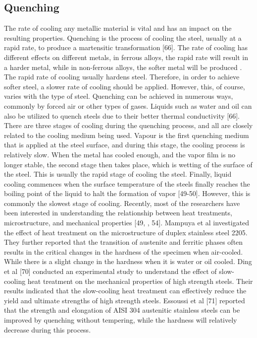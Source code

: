 \documentclass[12pt]{report}
\begin{document}
\subsection{Quenching}  
The rate of cooling any metallic material is vital and has an impact on the resulting properties. Quenching is the process of cooling the steel, usually at a rapid rate, to produce a martensitic transformation [66]. The rate of cooling has different effects on different metals, in ferrous alloys, the rapid rate will result in a harder metal, while in non-ferrous alloys, the softer metal will be produced \cite{mampuya2021effect}. The rapid rate of cooling usually hardens steel. Therefore, in order to achieve softer steel, a slower rate of cooling should be applied. However, this, of course, varies with the type of steel. 
Quenching can be achieved in numerous ways, commonly by forced air or other types of gases. Liquids such as water and oil can also be utilized to quench steels due to their better thermal conductivity [66]. There are three stages of cooling during the quenching process, and all are closely related to the cooling medium being used. Vapour is the first quenching medium that is applied at the steel surface, and during this stage, the cooling process is relatively slow. When the metal has cooled enough, and the vapor film is no longer stable, the second stage then takes place, which is wetting of the surface of the steel. This is usually the rapid stage of cooling the steel. Finally, liquid cooling commences when the surface temperature of the steels finally reaches the boiling point of the liquid to halt the formation of vapor [49-50]. However, this is commonly the slowest stage of cooling.
Recently, most of the researchers have been interested in understanding the relationship between heat treatments, microstructure, and mechanical properties [49, \cite{whitman1924effect}, 54]. Mampuya et al \cite{mampuya2021effect} investigated the effect of heat treatment on the microstructure of duplex stainless steel 2205. They further reported that the transition of austenite and ferritic phases often results in the critical changes in the hardness of the specimen when air-cooled. While there is a slight change in the hardness when it is water or oil cooled. Ding et al [70] conducted an experimental study to understand the effect of slow-cooling heat treatment on the mechanical properties of high strength steels. Their results indicated that the slow-cooling heat treatment can effectively reduce the yield and ultimate strengths of high strength steels. Essoussi et al [71] reported that the strength and elongation of AISI 304 austenitic stainless steels can be improved by quenching without tempering, while the hardness will relatively decrease during this process.
\end{document}
